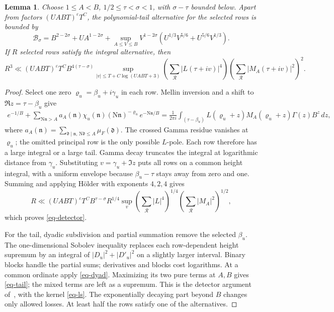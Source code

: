 \documentclass[11pt,a4paper]{article}
\numberwithin{equation}{section}
\newtheorem{lemma}[theorem]{Lemma}
\theoremstyle{remark}
\newcommand{\eps}{\varepsilon}
\newcommand{\R}{\mathcal R}
\newcommand{\B}{\mathcal B}
\newcommand{\N}{\mathrm N}
\begin{document}
\begin{lemma}\label{lem-detector}
Choose $1\le A<B$, $1/2\le\tau<\sigma<1$, with
$\sigma-\tau$ bounded below.  Apart from factors
$(UABT)^\eps T^C$, the polynomial-tail alternative for the
selected rows is bounded by
\begin{equation}\label{eq-tail}
 \B_\sigma=B^{2-2\sigma}+UA^{1-2\sigma}
 +\sup_{A\le V\le B}V^{1-2\sigma}
       (U^{1/3}V^{5/6}+U^{5/6}V^{1/3}).
\end{equation}
If $R$ selected rows satisfy the integral alternative, then
\begin{equation}\label{eq-detector}
 R^3\ll(UABT)^\eps T^C B^{4(\tau-\sigma)}
 \sup_{|v|\le T+C\log(UABT+3)}
 \left(\sum_{\R}|L(\tau+iv)|^4\right)
 \left(\sum_{\R}|M_A(\tau+iv)|^2\right)^2.
\end{equation}
\end{lemma}

\begin{proof}
Select one zero $\varrho_u=\beta_u+i\gamma_u$ in each row.
Mellin inversion and a shift to $\Re z=\tau-\beta_u$ give
\begin{align*}
 e^{-1/B}+\sum_{\N\mathfrak n>A}
 a_A(\mathfrak n)\chi_u(\mathfrak n)
 (\N\mathfrak n)^{-\varrho_u}e^{-\N\mathfrak n/B}
 =\frac1{2\pi i}\int_{(\tau-\beta_u)}
 L(\varrho_u+z)M_A(\varrho_u+z)\Gamma(z)B^z\,dz,
\end{align*}
where $a_A(\mathfrak n)=\sum_{\mathfrak d\mid\mathfrak n,
\,\N\mathfrak d\le A}\mu_F(\mathfrak d)$.
The crossed Gamma residue vanishes at $\varrho_u$; the omitted
principal row is the only possible $L$-pole.  Each row therefore
has a large integral or a large tail.  Gamma decay truncates the
integral at logarithmic distance from $\gamma_u$.  Substituting
$v=\gamma_u+\Im z$ puts all rows on a common height integral,
with a uniform envelope because $\beta_u-\tau$ stays away from
zero and one.  Summing and applying H\"older with exponents
$4,2,4$ gives
\[
 R\ll (UABT)^\eps T^C B^{\tau-\sigma}R^{1/4}
 \sup_v\left(\sum_{\R}|L|^4\right)^{1/4}
             \left(\sum_{\R}|M_A|^2\right)^{1/2},
\]
which proves \eqref{eq-detector}.

For the tail, dyadic subdivision and partial summation remove
the selected $\beta_u$.  The one-dimensional Sobolev inequality
replaces each row-dependent height supremum by an integral of
$|D_u|^2+|D'_u|^2$ on a slightly larger interval.  Binary blocks
handle the partial sums; derivatives and blocks cost logarithms.
At a common ordinate apply \eqref{eq-dyad}.  Maximizing its
two pure terms at $A,B$ gives \eqref{eq-tail}; the mixed terms
are left as a supremum.  This is the detector argument
of~\cite[Section~5]{BGL}, with the kernel \eqref{eq-ls}.
The exponentially decaying part beyond $B$ changes only allowed
losses.  At least half the rows satisfy one of the alternatives.
\end{proof}
\end{document}
